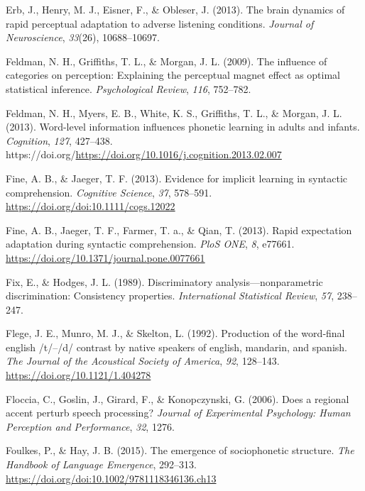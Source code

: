 \documentclass[
  11pt,
  english,
  man,floatsintext]{apa6}
\newlength{\cslhangindent}
\newlength{\cslentryspacingunit} %
\newenvironment{CSLReferences}[2] %
 {%
  \setlength{\parindent}{0pt}
  \ifodd #1
  \let\oldpar\par
  \def\par{\hangindent=\cslhangindent\oldpar}
  \fi
  \setlength{\parskip}{#2\cslentryspacingunit}
 }%
 {}
\begin{document}
\begin{CSLReferences}{1}{0}
\leavevmode{}%
Erb, J., Henry, M. J., Eisner, F., \& Obleser, J. (2013). The brain dynamics of rapid perceptual adaptation to adverse listening conditions. \emph{Journal of Neuroscience}, \emph{33}(26), 10688--10697.

\leavevmode{}%
Feldman, N. H., Griffiths, T. L., \& Morgan, J. L. (2009). The influence of categories on perception: Explaining the perceptual magnet effect as optimal statistical inference. \emph{Psychological Review}, \emph{116}, 752--782.

\leavevmode{}%
Feldman, N. H., Myers, E. B., White, K. S., Griffiths, T. L., \& Morgan, J. L. (2013). Word-level information influences phonetic learning in adults and infants. \emph{Cognition}, \emph{127}, 427--438. https://doi.org/\url{https://doi.org/10.1016/j.cognition.2013.02.007}

\leavevmode{}%
Fine, A. B., \& Jaeger, T. F. (2013). Evidence for implicit learning in syntactic comprehension. \emph{Cognitive Science}, \emph{37}, 578--591. \url{https://doi.org/doi:10.1111/cogs.12022}

\leavevmode{}%
Fine, A. B., Jaeger, T. F., Farmer, T. a., \& Qian, T. (2013). Rapid expectation adaptation during syntactic comprehension. \emph{PloS ONE}, \emph{8}, e77661. \url{https://doi.org/10.1371/journal.pone.0077661}

\leavevmode{}%
Fix, E., \& Hodges, J. L. (1989). Discriminatory analysis---nonparametric discrimination: Consistency properties. \emph{International Statistical Review}, \emph{57}, 238--247.

\leavevmode{}%
Flege, J. E., Munro, M. J., \& Skelton, L. (1992). Production of the word‐final english /t/--/d/ contrast by native speakers of english, mandarin, and spanish. \emph{The Journal of the Acoustical Society of America}, \emph{92}, 128--143. \url{https://doi.org/10.1121/1.404278}

\leavevmode{}%
Floccia, C., Goslin, J., Girard, F., \& Konopczynski, G. (2006). Does a regional accent perturb speech processing? \emph{Journal of Experimental Psychology: Human Perception and Performance}, \emph{32}, 1276.

\leavevmode{}%
Foulkes, P., \& Hay, J. B. (2015). The emergence of sociophonetic structure. \emph{The Handbook of Language Emergence}, 292--313. \url{https://doi.org/doi:10.1002/9781118346136.ch13}


\end{CSLReferences}
\end{document}

